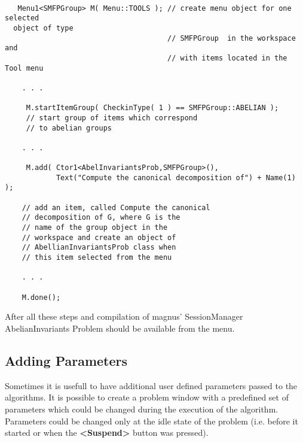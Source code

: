 \documentclass[12pt]{article}
\begin{document}
  \footnotesize
  \begin{verbatim}

   Menu1<SMFPGroup> M( Menu::TOOLS ); // create menu object for one selected 
  object of type
                                      // SMFPGroup  in the workspace and 
                                      // with items located in the Tool menu 

    . . .

     M.startItemGroup( CheckinType( 1 ) == SMFPGroup::ABELIAN ); 
     // start group of items which correspond
     // to abelian groups
   
    . . .

     M.add( Ctor1<AbelInvariantsProb,SMFPGroup>(),  
            Text("Compute the canonical decomposition of") + Name(1) );    

    // add an item, called Compute the canonical 
    // decomposition of G, where G is the
    // name of the group object in the
    // workspace and create an object of
    // AbellianInvariantsProb class when 
    // this item selected from the menu 

    . . .
    
    M.done();

  \end{verbatim}
  \normalsize

  After all these steps and compilation of magnus' SessionManager 
  AbelianInvariants Problem should be available from  the menu.

\subsection{Adding Parameters}

Sometimes it is usefull to have additional user defined parameters 
passed to the algorithms. It is possible to create a problem window
with  a predefined set of parameters which could be changed during 
the execution of the algorithm. Parameters could be changed only at 
the idle state of the problem (i.e. before it started or when the 
\textbf{<Suspend>} button  was pressed). 
\end{document}
